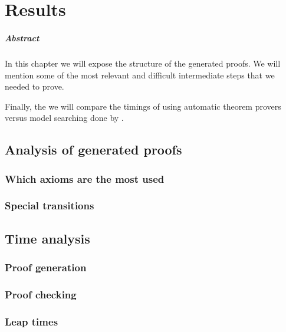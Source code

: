 \chapter{Results\label{chap:results}}

\paragraph{Abstract} In this chapter we will expose the structure of the generated proofs. We will mention some of the most relevant and difficult intermediate steps that we needed to prove.

Finally, the we will compare the timings of using automatic theorem provers versus model searching done by .

\section{Analysis of generated proofs}

\subsection{Which axioms are the most used}

\subsection{Special transitions}

\section{Time analysis}

\subsection{Proof generation}

\subsection{Proof checking}

\subsection{Leap times}

